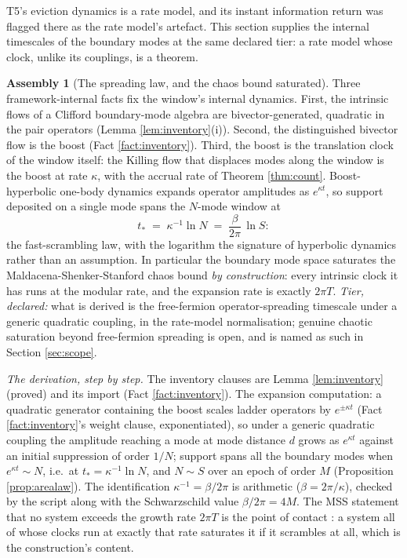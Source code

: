 \documentclass[11pt]{article}
\theoremstyle{definition}
\newtheorem{assembly}[theorem]{Assembly}
\begin{document}
T5's eviction dynamics is a rate model, and its instant information return was flagged there as the rate model's artefact. This section supplies the internal timescales of the boundary modes at the same declared tier: a rate model whose clock, unlike its couplings, is a theorem.

\begin{assembly}[The spreading law, and the chaos bound saturated]\label{asm:spreading}
Three framework-internal facts fix the window's internal dynamics. First, the intrinsic flows of a Clifford boundary-mode algebra are bivector-generated, quadratic in the pair operators (Lemma \ref{lem:inventory}(i)). Second, the distinguished bivector flow is the boost (Fact \ref{fact:inventory}). Third, the boost is the translation clock of the window itself: the Killing flow that displaces modes along the window is the boost at rate $\kappa$, with the accrual rate of Theorem \ref{thm:count}. Boost-hyperbolic one-body dynamics expands operator amplitudes as $e^{\kappa t}$, so support deposited on a single mode spans the $N$-mode window at
\[
t_* \;=\; \kappa^{-1}\ln N \;=\; \frac{\beta}{2\pi}\,\ln S :
\]
the fast-scrambling law, with the logarithm the signature of hyperbolic dynamics rather than an assumption. In particular the boundary mode space saturates the Maldacena-Shenker-Stanford chaos bound \emph{by construction}: every intrinsic clock it has runs at the modular rate, and the expansion rate is exactly $2\pi T$. \emph{Tier, declared:} what is derived is the free-fermion operator-spreading timescale under a generic quadratic coupling, in the rate-model normalisation; genuine chaotic saturation beyond free-fermion spreading is open, and is named as such in Section \ref{sec:scope}.

\smallskip
\noindent\emph{The derivation, step by step.} The inventory clauses are Lemma \ref{lem:inventory} (proved) and its import (Fact \ref{fact:inventory}). The expansion computation: a quadratic generator containing the boost scales ladder operators by $e^{\pm\kappa t}$ (Fact \ref{fact:inventory}'s weight clause, exponentiated), so under a generic quadratic coupling the amplitude reaching a mode at mode distance $d$ grows as $e^{\kappa t}$ against an initial suppression of order $1/N$; support spans all the boundary modes when $e^{\kappa t} \sim N$, i.e.\ at $t_* = \kappa^{-1}\ln N$, and $N \sim S$ over an epoch of order $M$ (Proposition \ref{prop:arealaw}). The identification $\kappa^{-1} = \beta/2\pi$ is arithmetic ($\beta = 2\pi/\kappa$), checked by the script along with the Schwarzschild value $\beta/2\pi = 4M$. The MSS statement that no system exceeds the growth rate $2\pi T$ is the point of contact \cite{MSS2016}: a system all of whose clocks run at exactly that rate saturates it if it scrambles at all, which is the construction's content.
\end{assembly}
\end{document}
